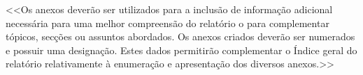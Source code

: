 \documentclass[a4paper,12pt]{scrreprt}
\begin{document}

    <<Os anexos deverão ser utilizados para a inclusão de informação adicional necessária para uma melhor compreensão do relatório o para complementar tópicos, secções ou assuntos abordados. Os anexos criados deverão ser numerados e possuir uma designação. Estes dados permitirão complementar o Índice geral do relatório relativamente à enumeração e apresentação dos diversos anexos.>>
    


\end{document}
